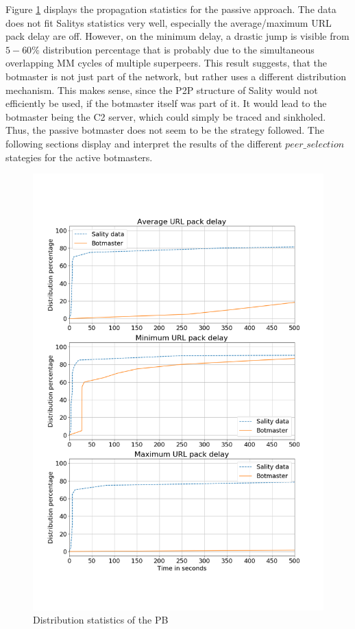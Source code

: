 \documentclass{article}
\begin{document}
Figure \ref{fig:PBstats} displays the propagation statistics for the passive approach. The data does not fit Salitys statistics very well, especially the average/maximum URL pack delay are off. However, on the minimum delay, a drastic jump is visible from $5-60\%$ distribution percentage that is probably due to the simultaneous overlapping MM cycles of multiple superpeers. This result suggests, that the botmaster is not just part of the network, but rather uses a different distribution mechanism. This makes sense, since the P2P structure of Sality would not efficiently be used, if the botmaster itself was part of it. It would lead to the botmaster being the C2 server, which could simply be traced and sinkholed. Thus, the passive botmaster does not seem to be the strategy followed. The following sections display and interpret the results of the different $peer\_selection$ stategies for the active botmasters.

\begin{figure}[H]
    \centering
    \includegraphics[width=\textwidth]{BV1-PS1.png}
    \caption{Distribution statistics of the PB}
    \label{fig:PBstats}
\end{figure}
\end{document}
